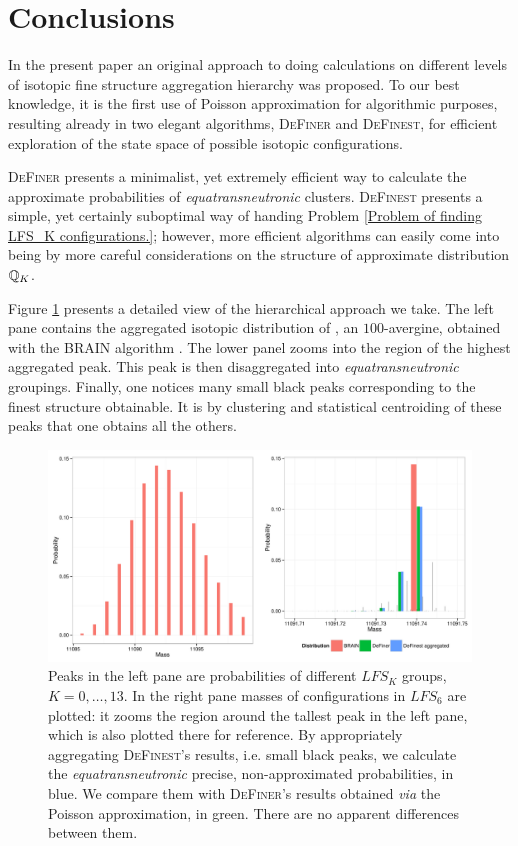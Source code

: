\section{Conclusions}

	In the present paper an original approach to doing calculations on different levels of isotopic fine structure aggregation hierarchy was proposed. To our best knowledge, it is the first use of Poisson approximation for algorithmic purposes,   resulting already in two elegant algorithms, \textsc{DeFiner} and \textsc{DeFinest}, for efficient exploration of the state space of possible isotopic configurations.  

	\textsc{DeFiner} presents a minimalist, yet extremely efficient way to calculate the approximate probabilities of {\it equatransneutronic} clusters. \textsc{DeFinest} presents a simple, yet certainly suboptimal way of handing Problem \ref{Problem of finding LFS_K configurations.}; however, more efficient algorithms can easily come into being by more careful considerations on the structure of approximate distribution $\mathbb{Q}_K$. 

	Figure \ref{figure: hierarchy} presents a detailed view of the hierarchical approach we take. The left pane contains the  aggregated isotopic distribution of \testAvergine, an $100$-avergine, obtained with the {\sc BRAIN} algorithm \cite{Dittwald2013BRAIN}. The lower panel zooms into the region of the highest aggregated peak. This peak is then disaggregated into {\it equatransneutronic} groupings. Finally, one notices many small black peaks corresponding to the finest structure obtainable. It is by clustering and statistical centroiding of these peaks that one obtains all the others. 

\begin{figure}[htbp]
 \centering
 \includegraphics[width=\textwidth]{./img/hierarchyHorizontal}
 \caption{ Peaks in the left pane are probabilities of different $LFS_K$ groups, $K = 0,\dots,13$. In the right pane masses of configurations in $LFS_6$ are plotted: it zooms the region around the tallest peak in the left pane, which is also plotted there for reference. By appropriately aggregating \textsc{DeFinest}'s results, i.e. small black peaks, we calculate the {\it equatransneutronic} precise, non-approximated probabilities, in blue. We compare them with \textsc{DeFiner}'s results obtained {\it via} the Poisson approximation, in green. There are no apparent differences between them. }
 \label{figure: hierarchy}
\end{figure}


